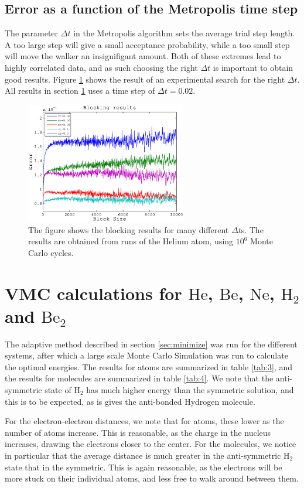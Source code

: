 \documentclass[aps,prc,twocolumn,floatfix]{revtex4}
\begin{document}
\subsection{Error as a function of the Metropolis time step}
The parameter $\Delta t$ in the Metropolis algorithm sets the average trial step length. A too large step will give a small acceptance probability, while a too small step will move the walker an insignifigant amount. Both of these extremes lead to highly correlated data, and as such choosing the right $\Delta t$ is important to obtain good results. Figure \ref{fig:blockdt} shows the result of an experimental search for the right $\Delta t$. All results in section \ref{sec:res} uses a time step of $\Delta t = 0.02$.

  \begin{figure}
\centering
\includegraphics[width=7cm]{figures/blockingdt.eps}
\caption{\label{fig:blockdt} The figure shows the blocking results for many different $\Delta t$s. The results are obtained from runs of the Helium atom, using $10^6$ Monte Carlo cycles.}
\end{figure}

\section{VMC calculations for $\text{He}$, $\text{Be}$, $\text{Ne}$, $\text{H}_2$ and $\text{Be}_2$}
\label{sec:res}
The adaptive method described in section \ref{sec:minimize} was run for the different systems, after which a large scale Monte Carlo Simulation was run to calculate the optimal energies. The results for atoms are summarized in table \ref{tab:3}, and the results for molecules are summarized in table \ref{tab:4}. We note that the anti-symmetric state of $\text{H}_2$ has much higher energy than the symmetric solution, and this is to be expected, as is gives the anti-bonded Hydrogen molecule. 

For the electron-electron distances, we note that for atoms, these lower as the number of atoms increase. This is reasonable, as the charge in the nucleus increases, drawing the electrons closer to the center. For the molecules, we notice in particular that the average distance is much greater in the anti-symmetric $\text{H}_2$ state that in the symmetric. This is again reasonable, as the electrons will be more stuck on their individual atoms, and less free to walk around between them. 
\end{document}

